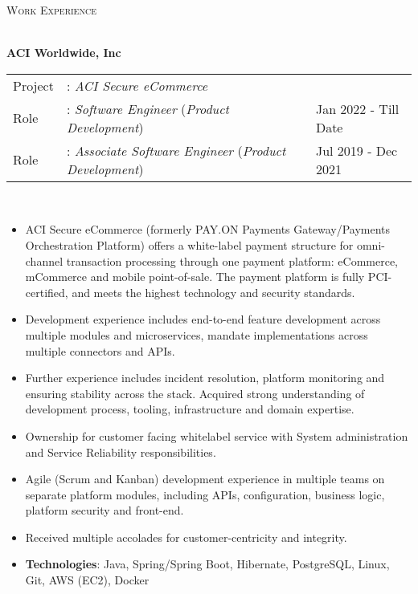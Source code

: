 \documentclass[a4paper]{article}
\newcommand{\lineunder} {
    \vspace*{-8pt} \\
    \hspace*{-18pt} \hrulefill \\
}
\newcommand{\header} [1] {
    {\hspace*{-18pt}\vspace*{6pt} \textsc{#1}}
    \vspace*{-6pt} \lineunder
}
\begin{document}
\header{Work Experience}
\vspace{1mm}

\textbf{ACI Worldwide, Inc} \\
\noindent
\begin{tabularx}{\textwidth}{ l l>{\raggedleft\arraybackslash}X}
  Project & : \textit{ACI Secure eCommerce} & \\
  Role & : \textit{Software Engineer} (\textit{Product Development})  & Jan 2022 - Till Date \\
  Role & : \textit{Associate Software Engineer} (\textit{Product Development})  & Jul 2019 - Dec 2021 \\
\end{tabularx}
\textbf{} \\
\begin{itemize} \itemsep 1pt
  \item ACI Secure eCommerce (formerly PAY.ON Payments Gateway/Payments Orchestration Platform) offers a white-label payment structure for omni-channel transaction processing through one payment platform: eCommerce, mCommerce and mobile point-of-sale. The payment platform is fully PCI-certified, and meets the highest technology and security standards.
  \item Development experience includes end-to-end feature development across multiple modules and microservices, mandate implementations across multiple connectors and APIs.
  \item Further experience includes incident resolution, platform monitoring and ensuring stability across the stack. Acquired strong understanding of development process, tooling, infrastructure and domain expertise.
  \item Ownership for customer facing whitelabel service with System administration and Service Reliability responsibilities.
  \item Agile (Scrum and Kanban) development experience in multiple teams on separate platform modules, including APIs, configuration, business logic, platform security and front-end.
  \item Received multiple accolades for customer-centricity and integrity.
  \item \textbf{Technologies}: Java, Spring/Spring Boot, Hibernate, PostgreSQL, Linux, Git, AWS (EC2), Docker
\end{itemize}

\end{document}
